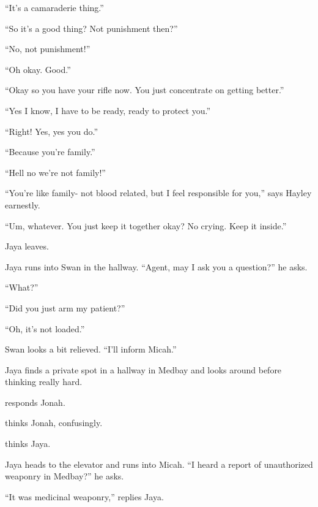 ``It's a camaraderie thing.''

``So it's a good thing?  Not punishment then?''

``No, not punishment!''

``Oh okay.  Good.''

``Okay so you have your rifle now.  You just concentrate on getting better.''

``Yes I know, I have to be ready, ready to protect you.''

``Right!  Yes, yes you do.''

``Because you're family.''

``Hell no we're not family!''

``You're like family- not blood related, but I feel responsible for you,'' says Hayley earnestly.

``Um, whatever.  You just keep it together okay?  No crying.  Keep it inside.''

Jaya leaves.





Jaya runs into Swan in the hallway.  ``Agent, may I ask you a question?'' he asks.

``What?''

``Did you just arm my patient?'' 

``Oh, it's not loaded.''

Swan looks a bit relieved. ``I'll inform Micah.''



Jaya finds a private spot in a hallway in Medbay and looks around before thinking   really hard.

  responds Jonah.




  thinks Jonah, confusingly.

 thinks Jaya.




Jaya heads to the elevator and runs into Micah.  ``I heard a report of unauthorized weaponry in Medbay?'' he asks.

``It was medicinal weaponry,'' replies Jaya.

